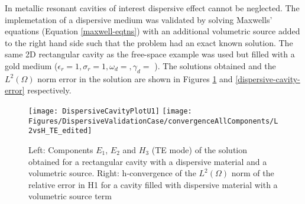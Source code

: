 \documentclass[times,11pt]{ACME2015article}
\begin{document}
\begin{normalsize}

In metallic resonant cavities of interest dispersive effect cannot be neglected. The implemetation of a dispersive medium was validated by solving Maxwells' equations (Equation \ref{maxwell-eqtns}) with an additional volumetric source added to the right hand side such that the problem had an exact known solution. The same 2D rectangular cavity as the free-space example was used but filled with a gold medium ($\epsilon_r = 1, \sigma_r = 1, \omega_d = , \gamma_d = $ ).
The solutions obtained and the $L^2(\Omega)$ norm error in the solution are shown in Figures \ref{dispersive_validation} and \ref{dispersive-cavity-error} respectively.

%

\begin{figure}[htbp]
 \centering
 \texttt{[image: DispersiveCavityPlotU1]}
 \texttt{[image: Figures/DispersiveValidationCase/convergenceAllComponents/L2vsH\_TE\_edited]}
 \caption{Left: Components $E_1$, $E_2$ and $H_3$ (TE mode) of the solution obtained for a rectangular cavity with a dispersive material and a volumetric source. Right: h-convergence of the $L^2(\Omega)$ norm of the relative error in H1 for a cavity filled with dispersive material with a volumetric source term}
 \label{dispersive_validation}
\end{figure}


\end{normalsize}
\end{document}
